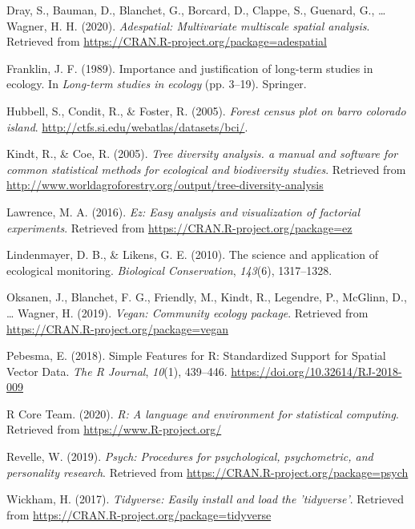 \documentclass[11pt,]{article}
\begin{document}
\hypertarget{ref-adespatial}{}
Dray, S., Bauman, D., Blanchet, G., Borcard, D., Clappe, S., Guenard,
G., \ldots{} Wagner, H. H. (2020). \emph{Adespatial: Multivariate
multiscale spatial analysis}. Retrieved from
\url{https://CRAN.R-project.org/package=adespatial}

\hypertarget{ref-franklin1989importance}{}
Franklin, J. F. (1989). Importance and justification of long-term
studies in ecology. In \emph{Long-term studies in ecology} (pp. 3--19).
Springer.

\hypertarget{ref-Hubbell2005Barro}{}
Hubbell, S., Condit, R., \& Foster, R. (2005). \emph{Forest census plot
on barro colorado island}.
\url{http://ctfs.si.edu/webatlas/datasets/bci/}.

\hypertarget{ref-Biodiv}{}
Kindt, R., \& Coe, R. (2005). \emph{Tree diversity analysis. a manual
and software for common statistical methods for ecological and
biodiversity studies}. Retrieved from
\url{http://www.worldagroforestry.org/output/tree-diversity-analysis}

\hypertarget{ref-EZ}{}
Lawrence, M. A. (2016). \emph{Ez: Easy analysis and visualization of
factorial experiments}. Retrieved from
\url{https://CRAN.R-project.org/package=ez}

\hypertarget{ref-lindenmayer2010science}{}
Lindenmayer, D. B., \& Likens, G. E. (2010). The science and application
of ecological monitoring. \emph{Biological Conservation}, \emph{143}(6),
1317--1328.

\hypertarget{ref-VeganPack}{}
Oksanen, J., Blanchet, F. G., Friendly, M., Kindt, R., Legendre, P.,
McGlinn, D., \ldots{} Wagner, H. (2019). \emph{Vegan: Community ecology
package}. Retrieved from \url{https://CRAN.R-project.org/package=vegan}

\hypertarget{ref-sfpackage}{}
Pebesma, E. (2018). Simple Features for R: Standardized Support for
Spatial Vector Data. \emph{The R Journal}, \emph{10}(1), 439--446.
\url{https://doi.org/10.32614/RJ-2018-009}

\hypertarget{ref-RSoft}{}
R Core Team. (2020). \emph{R: A language and environment for statistical
computing}. Retrieved from \url{https://www.R-project.org/}

\hypertarget{ref-psych}{}
Revelle, W. (2019). \emph{Psych: Procedures for psychological,
psychometric, and personality research}. Retrieved from
\url{https://CRAN.R-project.org/package=psych}

\hypertarget{ref-Tidyverse}{}
Wickham, H. (2017). \emph{Tidyverse: Easily install and load the
'tidyverse'}. Retrieved from
\url{https://CRAN.R-project.org/package=tidyverse}




\newpage
\singlespacing 
\end{document}
